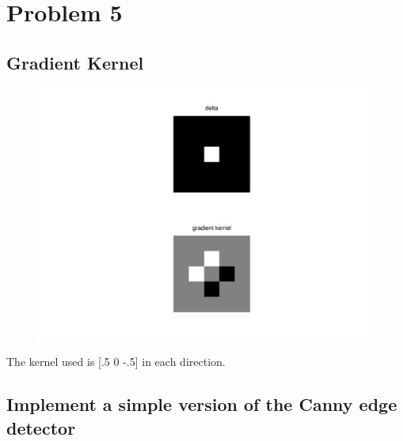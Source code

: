 \documentclass{article}
\begin{document}
	\newpage
	\section{Problem 5}
	\subsection{Gradient Kernel}
	\begin{figure}[H]
		\includegraphics[width=\linewidth]{Q5/partA.png}
	\end{figure}
	The kernel used is [.5 0 -.5] in each direction.
	
	\newpage
	\subsection{Implement a simple version of the Canny edge detector}
	
	
	\newpage
\end{document}
